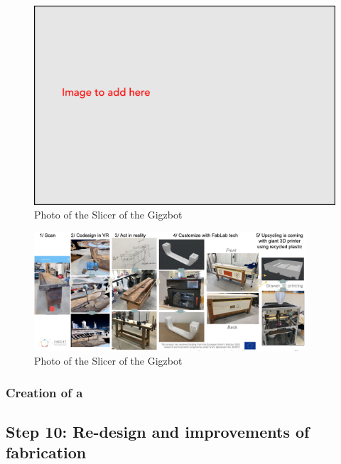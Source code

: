 \documentclass[
  11pt,
]{article}
\begin{document}
\begin{figure}[H]

{\centering \includegraphics[width=1\textwidth,height=\textheight]{figures/Image-to-add.png}

}

\caption{Photo of the Slicer of the Gigzbot}

\end{figure}

\begin{figure}[H]

{\centering \includegraphics[width=0.9\textwidth,height=\textheight]{figures/demos/workbench/2022-02-24 Processus INEDIT.png}

}

\caption{Photo of the Slicer of the Gigzbot}

\end{figure}

\hypertarget{creation-of-a}{%
\subsubsection{Creation of a}\label{creation-of-a}}

\hypertarget{step-10-re-design-and-improvements-of-fabrication}{%
\subsection{Step 10: Re-design and improvements of
fabrication}\label{step-10-re-design-and-improvements-of-fabrication}}
\end{document}
